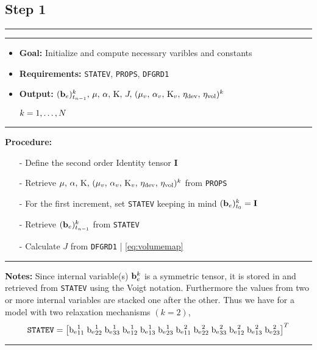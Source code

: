 \subsection*{Step 1}
\vspace{0.1cm}
\hrule
\vspace{0.1cm}
\hrule
\begin{itemize}
    \item \textbf{Goal:} Initialize and compute necessary varibles and constants
    \item \textbf{Requirements:} \texttt{STATEV}, \texttt{PROPS}, \texttt{DFGRD1}
    \item \textbf{Output:} \(({\mathbf{b}_{e}})^{k}_{t_{n-1}},\, \mu,\, \alpha,\, \mathrm{K},\, J,\, (\mu_{v},\, \alpha_{v},\, \mathrm{K}_{v},\, \eta_{\text{dev}},\, \eta_{\text{vol}})^k\)
    \item[] \(\hfill  k=1,\ldots,N\)
\end{itemize}
\vspace{0.1cm}
\hrule
\textbf{Procedure:}
\begin{itemize}
    \item[-] Define the second order Identity tensor \(\mathbf{I}\)
    \item[-] Retrieve \(\mu,\, \alpha,\, \mathrm{K},\, (\mu_{v},\, \alpha_{v},\, \mathrm{K}_{v},\, \eta_{\text{dev}},\, \eta_{\text{vol}})^k\) from \texttt{PROPS}
    \item[-] For the first increment, set \texttt{STATEV} keeping in mind \(({\mathbf{b}_{e}})^{k}_{t_{0}} = \mathbf{I}\)
    \item[-] Retrieve \(({\mathbf{b}_{e}})^{k}_{t_{n-1}}\) from \texttt{STATEV}
    \item[-] Calculate \(J\) from \texttt{DFGRD1} \hfill | \cref{eq:volumemap} 
\end{itemize}
\vspace{0.1cm}
\hrule
\textbf{Notes:} \newline
Since internal variable(s) \(\mathbf{b}_{e}^{k}\) is a symmetric tensor, it is stored in and retrieved from \texttt{STATEV} using the Voigt notation. Furthermore the values from two or more internal variables are stacked one after the other. Thus we have for a model with two relaxation mechanisms \((k=2)\), \[ \text{\texttt{STATEV}} = \left[\mathrm{b_e}^{1}_{11} \; \mathrm{b_e}^{1}_{22}\; \mathrm{b_e}^{1}_{33}\; \mathrm{b_e}^{1}_{12}\; \mathrm{b_e}^{1}_{13} \; \mathrm{b_e}^{1}_{23} \;\mathrm{b_e}^{2}_{11} \; \mathrm{b_e}^{2}_{22}\; \mathrm{b_e}^{2}_{33}\; \mathrm{b_e}^{2}_{12}\; \mathrm{b_e}^{2}_{13} \; \mathrm{b_e}^{2}_{23}\right]^{T}\]
\vspace{0.1cm}
\hrule
\vspace{0.8cm}


